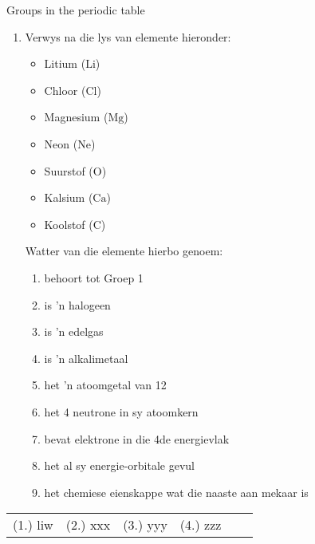 \begin{exercises}{Groups in the periodic table}
{\begin{enumerate}[noitemsep, label=\textbf{\arabic*}. ]
\item            \label{m38760*id262476}Verwys na die lys van elemente hieronder: \label{m38760*id7632}\begin{itemize}[noitemsep]
            \item Litium ($\mathrm{Li}$)\item Chloor ($\mathrm{Cl}$)\item Magnesium ($\mathrm{Mg}$)\item Neon ($\mathrm{Ne}$)\item Suurstof ($\mathrm{O}$)\item Kalsium ($\mathrm{Ca}$)\item Koolstof ($\mathrm{C}$)\end{itemize}
        Watter van die elemente hierbo genoem:
        \label{m38760*id262499}\begin{enumerate}[noitemsep, label=\textbf{\alph*}. ] 
            \label{m38760*uid158}\item behoort tot Groep 1
\label{m38760*uid159}\item is 'n halogeen
\label{m38760*uid160}\item is 'n edelgas
\label{m38760*uid161}\item is 'n alkalimetaal
\label{m38760*uid162}\item het 'n atoomgetal van 12
\label{m38760*uid163}\item het 4 neutrone in sy atoomkern
\label{m38760*uid164}\item bevat elektrone in die 4de energievlak
\label{m38760*uid166}\item het al sy energie-orbitale gevul
\label{m38760*uid167}\item het chemiese eienskappe wat die naaste aan mekaar is
\end{enumerate}
\end{enumerate}

\practiceinfo
 \par \begin{tabular}[h]{cccccc}
 (1.) liw  & (2.) xxx & (3.) yyy & (4.) zzz \end{tabular}
}
\end{exercises}
